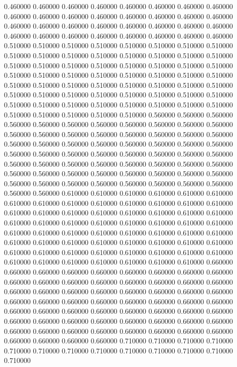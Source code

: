 0.460000
0.460000
0.460000
0.460000
0.460000
0.460000
0.460000
0.460000
0.460000
0.460000
0.460000
0.460000
0.460000
0.460000
0.460000
0.460000
0.460000
0.460000
0.460000
0.460000
0.460000
0.460000
0.460000
0.460000
0.460000
0.460000
0.460000
0.460000
0.460000
0.460000
0.460000
0.460000
0.510000
0.510000
0.510000
0.510000
0.510000
0.510000
0.510000
0.510000
0.510000
0.510000
0.510000
0.510000
0.510000
0.510000
0.510000
0.510000
0.510000
0.510000
0.510000
0.510000
0.510000
0.510000
0.510000
0.510000
0.510000
0.510000
0.510000
0.510000
0.510000
0.510000
0.510000
0.510000
0.510000
0.510000
0.510000
0.510000
0.510000
0.510000
0.510000
0.510000
0.510000
0.510000
0.510000
0.510000
0.510000
0.510000
0.510000
0.510000
0.510000
0.510000
0.510000
0.510000
0.510000
0.510000
0.510000
0.510000
0.510000
0.510000
0.510000
0.510000
0.510000
0.560000
0.560000
0.560000
0.560000
0.560000
0.560000
0.560000
0.560000
0.560000
0.560000
0.560000
0.560000
0.560000
0.560000
0.560000
0.560000
0.560000
0.560000
0.560000
0.560000
0.560000
0.560000
0.560000
0.560000
0.560000
0.560000
0.560000
0.560000
0.560000
0.560000
0.560000
0.560000
0.560000
0.560000
0.560000
0.560000
0.560000
0.560000
0.560000
0.560000
0.560000
0.560000
0.560000
0.560000
0.560000
0.560000
0.560000
0.560000
0.560000
0.560000
0.560000
0.560000
0.560000
0.560000
0.560000
0.560000
0.560000
0.560000
0.560000
0.560000
0.560000
0.610000
0.610000
0.610000
0.610000
0.610000
0.610000
0.610000
0.610000
0.610000
0.610000
0.610000
0.610000
0.610000
0.610000
0.610000
0.610000
0.610000
0.610000
0.610000
0.610000
0.610000
0.610000
0.610000
0.610000
0.610000
0.610000
0.610000
0.610000
0.610000
0.610000
0.610000
0.610000
0.610000
0.610000
0.610000
0.610000
0.610000
0.610000
0.610000
0.610000
0.610000
0.610000
0.610000
0.610000
0.610000
0.610000
0.610000
0.610000
0.610000
0.610000
0.610000
0.610000
0.610000
0.610000
0.610000
0.610000
0.610000
0.610000
0.610000
0.610000
0.610000
0.660000
0.660000
0.660000
0.660000
0.660000
0.660000
0.660000
0.660000
0.660000
0.660000
0.660000
0.660000
0.660000
0.660000
0.660000
0.660000
0.660000
0.660000
0.660000
0.660000
0.660000
0.660000
0.660000
0.660000
0.660000
0.660000
0.660000
0.660000
0.660000
0.660000
0.660000
0.660000
0.660000
0.660000
0.660000
0.660000
0.660000
0.660000
0.660000
0.660000
0.660000
0.660000
0.660000
0.660000
0.660000
0.660000
0.660000
0.660000
0.660000
0.660000
0.660000
0.660000
0.660000
0.660000
0.660000
0.660000
0.660000
0.660000
0.660000
0.660000
0.660000
0.710000
0.710000
0.710000
0.710000
0.710000
0.710000
0.710000
0.710000
0.710000
0.710000
0.710000
0.710000
0.710000
